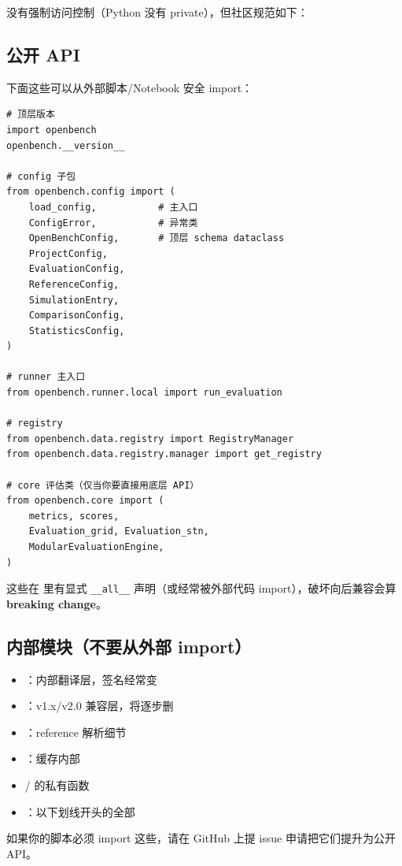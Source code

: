 \openbench{} 没有强制访问控制（Python 没有 private），但社区规范如下：

\subsection{公开 API}

下面这些可以从外部脚本/Notebook 安全 import：

\begin{verbatim}
# 顶层版本
import openbench
openbench.__version__

# config 子包
from openbench.config import (
    load_config,           # 主入口
    ConfigError,           # 异常类
    OpenBenchConfig,       # 顶层 schema dataclass
    ProjectConfig,
    EvaluationConfig,
    ReferenceConfig,
    SimulationEntry,
    ComparisonConfig,
    StatisticsConfig,
)

# runner 主入口
from openbench.runner.local import run_evaluation

# registry
from openbench.data.registry import RegistryManager
from openbench.data.registry.manager import get_registry

# core 评估类（仅当你要直接用底层 API）
from openbench.core import (
    metrics, scores,
    Evaluation_grid, Evaluation_stn,
    ModularEvaluationEngine,
)
\end{verbatim}

这些在  里有显式 \texttt{\_\_all\_\_} 声明（或经常被外部代码 import），破坏向后兼容会算 \textbf{breaking change}。

\subsection{内部模块（不要从外部 import）}

\begin{itemize}
  \item {}：内部翻译层，签名经常变
  \item {}：v1.x/v2.0 兼容层，将逐步删
  \item {}：reference 解析细节
  \item {}：缓存内部
  \item {} /  的私有函数
  \item {}：以下划线开头的全部
\end{itemize}

如果你的脚本必须 import 这些，请在 GitHub 上提 issue 申请把它们提升为公开 API。

